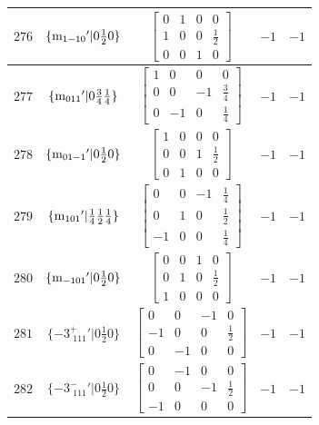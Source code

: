\documentclass[fleqn,8pt]{jsarticle}
\begin{document}
\begin{longtable}{ccccc}
$ 276 $ & $ \{{\rm m}_{1-10}{}'|0 \frac{1}{2} 0\} $ & $ \begin{bmatrix} 0 & 1 & 0 & 0 \\ 1 & 0 & 0 & \frac{1}{2} \\ 0 & 0 & 1 & 0 \end{bmatrix} $ & $ -1 $ & $ -1 $ \\ \hline
$ 277 $ & $ \{{\rm m}_{011}{}'|0 \frac{3}{4} \frac{1}{4}\} $ & $ \begin{bmatrix} 1 & 0 & 0 & 0 \\ 0 & 0 & -1 & \frac{3}{4} \\ 0 & -1 & 0 & \frac{1}{4} \end{bmatrix} $ & $ -1 $ & $ -1 $ \\ \hline
$ 278 $ & $ \{{\rm m}_{01-1}{}'|0 \frac{1}{2} 0\} $ & $ \begin{bmatrix} 1 & 0 & 0 & 0 \\ 0 & 0 & 1 & \frac{1}{2} \\ 0 & 1 & 0 & 0 \end{bmatrix} $ & $ -1 $ & $ -1 $ \\ \hline
$ 279 $ & $ \{{\rm m}_{101}{}'|\frac{1}{4} \frac{1}{2} \frac{1}{4}\} $ & $ \begin{bmatrix} 0 & 0 & -1 & \frac{1}{4} \\ 0 & 1 & 0 & \frac{1}{2} \\ -1 & 0 & 0 & \frac{1}{4} \end{bmatrix} $ & $ -1 $ & $ -1 $ \\ \hline
$ 280 $ & $ \{{\rm m}_{-101}{}'|0 \frac{1}{2} 0\} $ & $ \begin{bmatrix} 0 & 0 & 1 & 0 \\ 0 & 1 & 0 & \frac{1}{2} \\ 1 & 0 & 0 & 0 \end{bmatrix} $ & $ -1 $ & $ -1 $ \\ \hline
$ 281 $ & $ \{-3^{+}_{\,\,111}{}'|0 \frac{1}{2} 0\} $ & $ \begin{bmatrix} 0 & 0 & -1 & 0 \\ -1 & 0 & 0 & \frac{1}{2} \\ 0 & -1 & 0 & 0 \end{bmatrix} $ & $ -1 $ & $ -1 $ \\ \hline
$ 282 $ & $ \{-3^{-}_{\,\,111}{}'|0 \frac{1}{2} 0\} $ & $ \begin{bmatrix} 0 & -1 & 0 & 0 \\ 0 & 0 & -1 & \frac{1}{2} \\ -1 & 0 & 0 & 0 \end{bmatrix} $ & $ -1 $ & $ -1 $ \\ \hline

\end{longtable}
\end{document}
